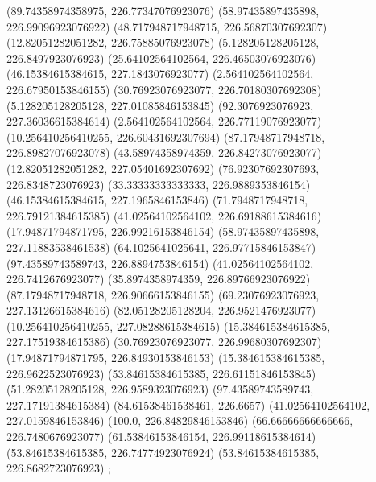 {{{		(89.74358974358975, 226.77347076923076)
		(58.97435897435898, 226.99096923076922)
		(48.717948717948715, 226.56870307692307)
		(12.82051282051282, 226.75885076923078)
		(5.128205128205128, 226.8497923076923)
		(25.64102564102564, 226.46503076923076)
		(46.15384615384615, 227.1843076923077)
		(2.564102564102564, 226.67950153846155)
		(30.76923076923077, 226.70180307692308)
		(5.128205128205128, 227.01085846153845)
		(92.3076923076923, 227.36036615384614)
		(2.564102564102564, 226.77119076923077)
		(10.256410256410255, 226.60431692307694)
		(87.17948717948718, 226.89827076923078)
		(43.58974358974359, 226.84273076923077)
		(12.82051282051282, 227.05401692307692)
		(76.92307692307693, 226.8348723076923)
		(33.33333333333333, 226.9889353846154)
		(46.15384615384615, 227.1965846153846)
		(71.7948717948718, 226.79121384615385)
		(41.02564102564102, 226.69188615384616)
		(17.94871794871795, 226.99216153846154)
		(58.97435897435898, 227.11883538461538)
		(64.1025641025641, 226.97715846153847)
		(97.43589743589743, 226.8894753846154)
		(41.02564102564102, 226.7412676923077)
		(35.8974358974359, 226.89766923076922)
		(87.17948717948718, 226.90666153846155)
		(69.23076923076923, 227.13126615384616)
		(82.05128205128204, 226.9521476923077)
		(10.256410256410255, 227.08288615384615)
		(15.384615384615385, 227.17519384615386)
		(30.76923076923077, 226.99680307692307)
		(17.94871794871795, 226.84930153846153)
		(15.384615384615385, 226.9622523076923)
		(53.84615384615385, 226.61151846153845)
		(51.28205128205128, 226.9589323076923)
		(97.43589743589743, 227.17191384615384)
		(84.61538461538461, 226.6657)
		(41.02564102564102, 227.0159846153846)
		(100.0, 226.84829846153846)
		(66.66666666666666, 226.7480676923077)
		(61.53846153846154, 226.99118615384614)
		(53.84615384615385, 226.74774923076924)
		(53.84615384615385, 226.8682723076923)
	};

}}
